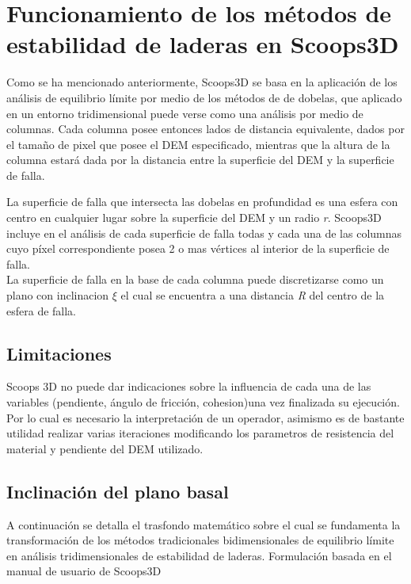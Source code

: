 \section{Funcionamiento de los m\'etodos de estabilidad de laderas en Scoops3D}



Como se ha mencionado anteriormente, Scoops3D se basa en la aplicaci\'on de los an\'alisis de equilibrio l\'imite por medio de los m\'etodos de de dobelas, que aplicado en un entorno tridimensional puede verse como una an\'alisis por medio de columnas.
Cada columna posee entonces lados de distancia equivalente, dados por el tama\~no de pixel que posee el DEM especificado, mientras que la altura de la columna estar\'a dada por la distancia entre la superficie del DEM y la superficie de falla.\cite{chen1981three}

La superficie de falla que intersecta las dobelas en profundidad es una esfera con centro en cualquier lugar sobre la superficie del DEM y un radio \textit{r}. Scoops3D incluye en el an\'alisis de cada superficie de falla todas y cada una de las columnas cuyo p\'ixel correspondiente posea 2 o mas v\'ertices al interior de la superficie de falla.\\

La superficie de falla en la base de cada columna puede discretizarse como un plano con inclinacion $ \xi$ el cual se encuentra a una distancia \textit{R} del centro de la esfera de falla. \cite{chen1981three}


\subsection{Limitaciones}
Scoops 3D no puede dar indicaciones sobre la influencia de cada una de las variables (pendiente, \'angulo de fricci\'on, cohesion)una vez finalizada su ejecuci\'on. Por lo cual es necesario la interpretaci\'on de un operador, asimismo es de bastante utilidad realizar varias iteraciones modificando los parametros de resistencia del material y pendiente del DEM utilizado.


\subsection{Inclinaci\'on del plano basal}

A continuaci\'on se detalla el trasfondo matem\'atico sobre el cual se fundamenta la transformaci\'on de los m\'etodos tradicionales bidimensionales de equilibrio l\'imite en an\'alisis  tridimensionales de estabilidad de laderas. 
Formulaci\'on basada en el manual de usuario de Scoops3D \cite{formulas}


